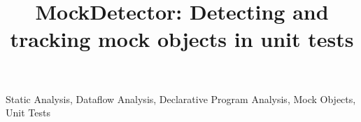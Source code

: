 \documentclass[conference]{IEEEtran}
\begin{document}

\title{MockDetector: Detecting and tracking mock objects in unit tests}


\maketitle



\begin{IEEEkeywords}
Static Analysis, Dataflow Analysis, Declarative Program Analysis, Mock Objects, Unit Tests
\end{IEEEkeywords}












%
\end{document}
